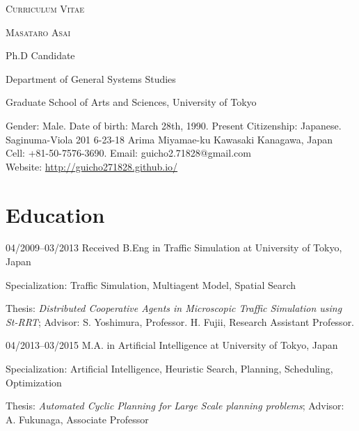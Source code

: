 \documentclass[a4paper]{article}
\begin{document}
\pagestyle{empty}

\begin{center}
\huge{\textsc{Curriculum Vitae}}
\vspace{\baselineskip}

\Large{\textsc{Masataro Asai}}
\vspace{0.5\baselineskip}

\large{
Ph.D Candidate

Department of General Systems Studies

Graduate School of Arts and Sciences, University of Tokyo
}

\vspace{0.8\baselineskip}

\normalsize{
 Gender: Male. \quad Date of birth: March 28th, 1990. \quad Present Citizenship: Japanese. \\
 Saginuma-Viola 201 6-23-18 Arima Miyamae-ku Kawasaki Kanagawa, Japan \\
 Cell: +81-50-7576-3690. Email: guicho2.71828@gmail.com \\
 Website: \url{http://guicho271828.github.io/}}
\end{center}


\section{Education}

\begin{CV}
 \item[04/2009--03/2013] Received B.Eng in Traffic Simulation at University of Tokyo, Japan
 
 Specialization: Traffic Simulation, Multiagent Model, Spatial Search
 
 Thesis: \emph{Distributed Cooperative Agents in Microscopic Traffic
 Simulation using St-RRT}; Advisor: S. Yoshimura, Professor. H. Fujii, Research Assistant Professor.

 \item[04/2013--03/2015] M.A. in Artificial Intelligence at University of Tokyo, Japan

 Specialization: Artificial Intelligence, Heuristic Search, Planning, Scheduling, Optimization

 Thesis: \emph{Automated Cyclic Planning for Large Scale planning problems};
 Advisor: A. Fukunaga, Associate Professor
\end{CV}
\end{document}

